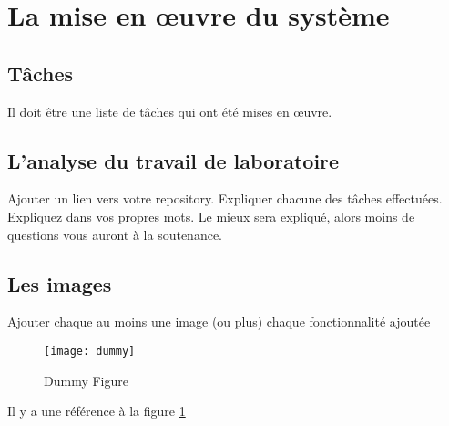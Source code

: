 \section{La mise en œuvre du système}

\subsection{Tâches}

Il doit être une liste de tâches qui ont été mises en œuvre.

\subsection{L'analyse du travail de laboratoire}

Ajouter un lien vers votre repository.
Expliquer chacune des tâches effectuées. Expliquez dans vos propres mots. Le mieux sera expliqué,
alors moins de questions vous auront à la soutenance.

\subsection{Les images}

Ajouter chaque au moins une image (ou plus) chaque fonctionnalité ajoutée
\begin{figure}[!ht]
\centering
\texttt{[image: dummy]}
\caption{Dummy Figure}\label{dummy}
\end{figure}

Il y a une référence à la figure \ref{dummy}

\clearpage
